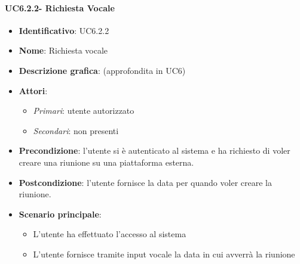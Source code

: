 \paragraph{UC6.2.2- Richiesta Vocale}
\begin{itemize}
   \item \textbf{Identificativo}: UC6.2.2
   \item \textbf{Nome}: Richiesta vocale
   \item \textbf{Descrizione grafica}: (approfondita in UC6)
   \item \textbf{Attori}:
   \begin{itemize} 
       \item \textit{Primari}: utente autorizzato
       \item \textit{Secondari}: non presenti
   \end{itemize}
       \item \textbf{Precondizione}: l'utente si è autenticato al sistema e ha richiesto di voler creare una riunione su una piattaforma esterna.
       \item \textbf{Postcondizione}: l'utente fornisce la data per quando voler creare la riunione.
    \item \textbf{Scenario principale}: 
       \begin{itemize}
           \item L'utente ha effettuato l'accesso al sistema 
           \item L'utente fornisce tramite input vocale la data in cui avverrà la riunione
       \end{itemize}
\end{itemize}

